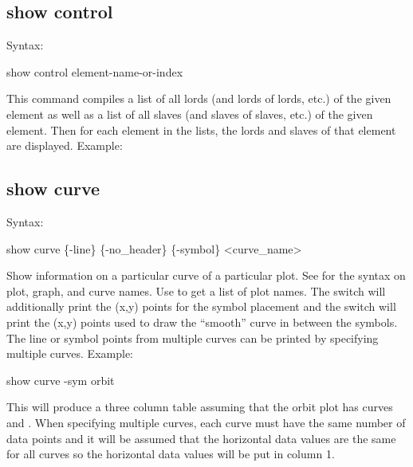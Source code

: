 {{{{{{{{%

\subsection{show control}
\label{s:show.control}

Syntax:
\begin{example}
  show control {element-name-or-index}
\end{example}

This command compiles a list of all lords (and lords of lords, etc.) of the given element as well as
a list of all slaves (and slaves of slaves, etc.) of the given element. Then for each element in the
lists, the lords and slaves of that element are displayed. Example:


\subsection{show curve}
\label{s:show.curve}

Syntax:
\begin{example}
  show curve \{-line\} \{-no_header\} \{-symbol\} <curve_name>
\end{example}

Show information on a particular curve of a particular plot. See  for the syntax on
plot, graph, and curve names.  Use  to get a list of plot names. The 
switch will additionally print the (x,y) points for the symbol placement and the  switch
will print the (x,y) points used to draw the ``smooth'' curve in between the symbols. The line or
symbol points from multiple curves can be printed by specifying multiple curves. Example:
\begin{example}
  show curve -sym orbit
\end{example}
This will produce a three column table assuming that the orbit plot has curves  and
. When specifying multiple curves, each curve must have the same number of data
points and it will be assumed that the horizontal data values are the same for all curves so the
horizontal data values will be put in column 1.

}}}}}}}}
